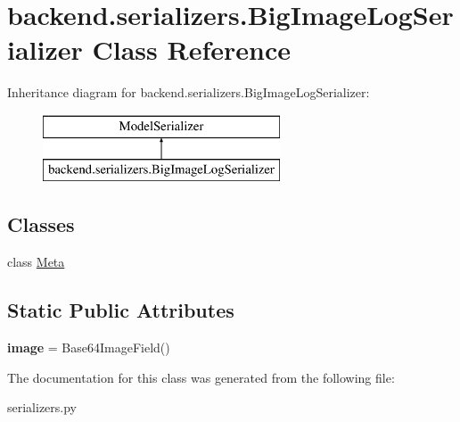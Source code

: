 \hypertarget{classbackend_1_1serializers_1_1_big_image_log_serializer}{}\section{backend.\+serializers.\+Big\+Image\+Log\+Serializer Class Reference}
\label{classbackend_1_1serializers_1_1_big_image_log_serializer}
Inheritance diagram for backend.\+serializers.\+Big\+Image\+Log\+Serializer\+:\begin{figure}[H]
\begin{center}
\leavevmode
\includegraphics[height=2.000000cm]{classbackend_1_1serializers_1_1_big_image_log_serializer}
\end{center}
\end{figure}
\subsection*{Classes}
\begin{DoxyCompactItemize}
\item 
class \hyperlink{classbackend_1_1serializers_1_1_big_image_log_serializer_1_1_meta}{Meta}
\end{DoxyCompactItemize}
\subsection*{Static Public Attributes}
\begin{DoxyCompactItemize}
\item 
\mbox{\label{classbackend_1_1serializers_1_1_big_image_log_serializer_a736735f74478b55e7378e2ba946ac110}} 
{\bfseries image} = Base64\+Image\+Field()
\end{DoxyCompactItemize}


The documentation for this class was generated from the following file\+:\begin{DoxyCompactItemize}
\item 
serializers.\+py\end{DoxyCompactItemize}
